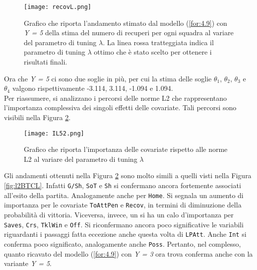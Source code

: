 \begin{figure}[htbp]
	\begin{center}
		\texttt{[image: recovL.png]}
		\caption{Grafico che riporta l'andamento stimato dal modello (\ref{for:4.9}) con \emph{Y = 5} della stima del numero di recuperi per ogni squadra al variare del parametro di tuning $\lambda$. La linea rossa tratteggiata indica il parametro di tuning $\lambda$ ottimo che è stato scelto per ottenere i risultati finali.} \label{fig:recovL5}
	\end{center}
\end{figure}
Ora che \emph{Y = 5} ci sono due soglie in più, per cui la stima delle soglie $\theta_1$, $\theta_2$, $\theta_3$ e $\theta_4$ valgono rispettivamente -3.114, 3.114, -1.094 e 1.094.\\
Per riassumere, si analizzano i percorsi delle norme L2 che rappresentano l'importanza complessiva dei singoli effetti delle covariate. Tali percorsi sono visibili nella Figura \ref{fig:IL52}.
\begin{figure}[]
	\begin{center}
		\texttt{[image: IL52.png]}
		\caption{Grafico che riporta l'importanza delle covariate rispetto alle norme L2 al variare del parametro di tuning $\lambda$} \label{fig:IL52}
	\end{center}
\end{figure}
Gli andamenti ottenuti nella Figura \ref{fig:IL52} sono molto simili a quelli visti nella Figura \ref{fig:l2BTCL}. Infatti \texttt{G/Sh}, \texttt{SoT} e \texttt{Sh} si confermano ancora fortemente associati all'esito della partita. Analogamente anche per \texttt{Home}. Si segnala un aumento di importanza per le covariate \texttt{ToAttPen} e \texttt{Recov}, in termini di diminuzione della probabilità di vittoria. Viceversa, invece, un si ha un calo d'importanza per \texttt{Saves}, \texttt{Crs}, \texttt{TklWin} e \texttt{Off}. Si riconfermano ancora poco significative le variabili riguardanti i passaggi fatta eccezione anche questa volta di \texttt{LPAtt}. Anche \texttt{Int} si conferma poco significato, analogamente anche \texttt{Poss}.
Pertanto, nel complesso, quanto ricavato del modello (\ref{for:4.9}) con \emph{Y = 3} ora trova conferma anche con la variante \emph{Y = 5}.
